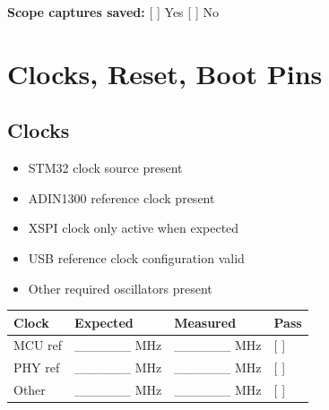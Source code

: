 \documentclass[10pt,a4paper,oneside]{report}
\providecommand{\tightlist}{\setlength{\itemsep}{1pt}\setlength{\parskip}{1pt}}
\begin{document}
\textbf{Scope captures saved:} {[} {]} Yes {[} {]} No

\section{Clocks, Reset, Boot Pins}\label{wiki-hardware-bring-up-and-testing--4-clocks-reset-boot-pins}

\subsection{Clocks}\label{wiki-hardware-bring-up-and-testing--41-clocks}

\begin{itemize}
\tightlist
\item[$\square$]
  STM32 clock source present
\item[$\square$]
  ADIN1300 reference clock present
\item[$\square$]
  XSPI clock only active when expected
\item[$\square$]
  USB reference clock configuration valid
\item[$\square$]
  Other required oscillators present
\end{itemize}

{\def\LTcaptype{none} %
\begin{longtable}[]{@{}
  >{\raggedright\arraybackslash}p{}
  >{\raggedleft\arraybackslash}p{}
  >{\raggedleft\arraybackslash}p{}
  >{\centering\arraybackslash}p{}@{}}
\toprule\noalign{}
\begin{minipage}[b]{\linewidth}\raggedright
\textbf{Clock}
\end{minipage} & \begin{minipage}[b]{\linewidth}\raggedleft
\textbf{Expected}
\end{minipage} & \begin{minipage}[b]{\linewidth}\raggedleft
\textbf{Measured}
\end{minipage} & \begin{minipage}[b]{\linewidth}\centering
\textbf{Pass}
\end{minipage} \\
\midrule\noalign{}
\endhead
\bottomrule\noalign{}
\endlastfoot
MCU ref & \_\_\_\_\_\_ MHz & \_\_\_\_\_\_ MHz & {[} {]} \\
PHY ref & \_\_\_\_\_\_ MHz & \_\_\_\_\_\_ MHz & {[} {]} \\
Other & \_\_\_\_\_\_ MHz & \_\_\_\_\_\_ MHz & {[} {]} \\
\end{longtable}
}
\end{document}
